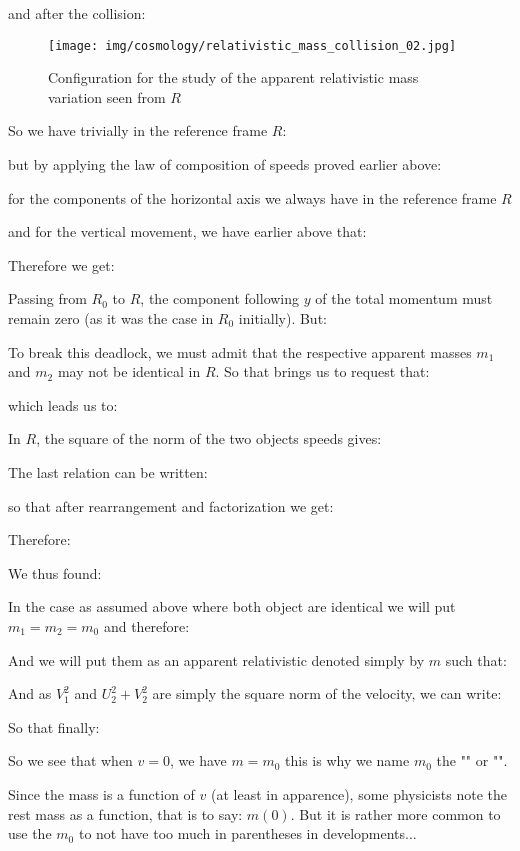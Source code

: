 	and after the collision:
	
	\begin{figure}[H]
		\begin{center}
		\texttt{[image: img/cosmology/relativistic\_mass\_collision\_02.jpg]}
		\caption{Configuration for the study of the apparent relativistic mass variation seen from $R$}
		\end{center}
	\end{figure}
	So we have trivially in the reference frame $R$:
	
	but by applying the law of composition of speeds proved earlier above:
	
	for the components of the horizontal axis we always have in the reference frame $R$
	
	and for the vertical movement, we have earlier above that:
	
	Therefore we get:
	
	Passing from $R_0$ to $R$, the component following $y$ of the total momentum must remain zero (as it was the case in $R_0$ initially). But:
	
	To break this deadlock, we must admit that the respective apparent masses $m_1$ and $m_2$ may not be identical in $R$. So that brings us to request that:
	
	which leads us to:
	
	In $R$, the square of the norm of the two objects speeds gives:
	
	The last relation can be written:
	
	so that after rearrangement and factorization we get:
	
	Therefore:
	
	We thus found:
	
	In the case as assumed above where both object are identical we will put $m_1=m_2=m_0$ and therefore:
	
	And we will put them as an apparent relativistic denoted simply by $m$ such that:
	
	And as $V_1^2$ and $U_2^2+V_2^2$ are simply the square norm of the velocity, we can write:
	
	So that finally:
	
	So we see that when $v=0$, we have $m=m_0$ this is why we name $m_0$ the "" or "".
	
	Since the mass is a function of $v$ (at least in apparence), some physicists note the rest mass as a function, that is to say: $m(0)$. But it is rather more common to use the $m_0$ to not have too much in parentheses in developments...
	
